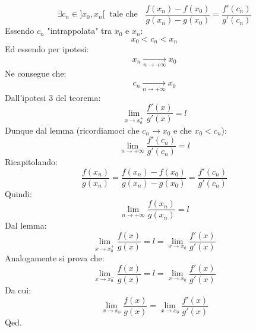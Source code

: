 {	\begin{equation*}
		\exists c_n \in ]x_0, x_n[ \;\; \text{tale che } \;\; \dfrac{f(x_n) - f(x_0)}{g(x_n) - g(x_0)} = \dfrac{f'(c_n)}{g'(c_n)}
	\end{equation*}
	Essendo $c_n$ "intrappolata" tra $x_0$ e $x_n$:
	\begin{equation*}
		x_0 < c_n < x_n
	\end{equation*}
	Ed essendo per ipotesi:
	\begin{equation*}
		x_n \xrightarrow[n \to + \infty]{} x_0
	\end{equation*}
	Ne consegue che:
	\begin{equation*}
		c_n \xrightarrow[n \to + \infty]{} x_0
	\end{equation*}
	Dall'ipotesi 3 del teorema:
	\begin{equation*}
		\lim_{x \to x_0^+} \dfrac{f'(x)}{g'(x)} = l
	\end{equation*}
	Dunque dal lemma (ricordiamoci che $c_n \to x_0$ e che $x_0 < c_n$):
	\begin{equation*}
		\lim_{n \to +\infty} \dfrac{f'(c_n)}{g'(c_n)} = l
	\end{equation*}
	Ricapitolando:
	\begin{equation*}
		\dfrac{f(x_n)}{g(x_n)} = \dfrac{f(x_n) - f(x_0)}{g(x_n) - g(x_0)} = \dfrac{f'(c_n)}{g'(c_n)}
	\end{equation*}
	Quindi:
	\begin{equation*}
		\lim_{n \to + \infty} \dfrac{f(x_n)}{g(x_n)} = l
	\end{equation*}
	Dal lemma:
	\begin{equation*}
		\lim_{x \to x_0^+} \dfrac{f(x)}{g(x)} = l = \lim_{x \to x_0} \dfrac{f'(x)}{g'(x)}
	\end{equation*}
	Analogamente si prova che:
	\begin{equation*}
		\lim_{x \to x_0^-} \dfrac{f(x)}{g(x)} = l = \lim_{x \to x_0} \dfrac{f'(x)}{g'(x)}
	\end{equation*}
	Da cui:
	\begin{equation*}
		\lim_{x \to x_0} \dfrac{f(x)}{g(x)} = \lim_{x \to x_0} \dfrac{f'(x)}{g'(x)}
	\end{equation*}
	\hfill Qed.
}






